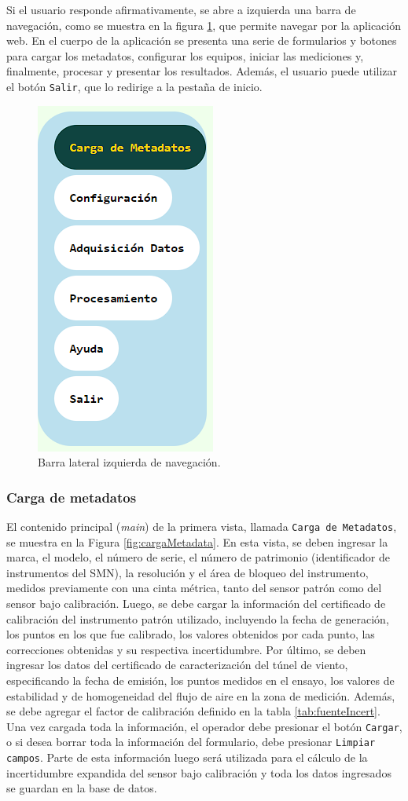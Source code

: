 Si el usuario responde afirmativamente, se abre a izquierda una barra de navegación, como se muestra en la figura \ref{fig:barraNavegIzq}, que permite navegar por la aplicación web. En el cuerpo de la aplicación se presenta una serie de formularios y botones para cargar los metadatos, configurar los equipos, iniciar las mediciones y, finalmente, procesar y presentar los resultados. Además, el usuario puede utilizar el botón \texttt{Salir}, que lo redirige a la pestaña de inicio.

\begin{figure}[H]
    \centering
    \includegraphics[width=0.2\linewidth]{Figuras/AplicacionWeb/frondend/barraNavegIzq.png}
    \caption{Barra lateral izquierda de navegación.}
    \label{fig:barraNavegIzq}
\end{figure}
\subsubsection{Carga de metadatos}\label{sec:cargaMetadatos}

El contenido principal (\textit{main}) de la primera vista, llamada \texttt{Carga de Metadatos}, se muestra en la Figura \ref{fig:cargaMetadata}. En esta vista, se deben ingresar la marca, el modelo, el número de serie, el número de patrimonio (identificador de instrumentos del SMN), la resolución y el área de bloqueo del instrumento, medidos previamente con una cinta métrica, tanto del sensor patrón como del sensor bajo calibración. Luego, se debe cargar la información del certificado de calibración del instrumento patrón utilizado, incluyendo la fecha de generación, los puntos en los que fue calibrado, los valores obtenidos por cada punto, las correcciones obtenidas y su respectiva incertidumbre. Por último, se deben ingresar los datos del certificado de caracterización del túnel de viento, especificando la fecha de emisión, los puntos medidos en el ensayo, los valores de estabilidad y de homogeneidad del flujo de aire en la zona de medición. Además, se debe agregar el factor de calibración definido en la tabla \ref{tab:fuenteIncert}. Una vez cargada toda la información, el operador debe presionar el botón \texttt{Cargar}, o si desea borrar toda la información del formulario, debe presionar \texttt{Limpiar campos}. Parte de esta información luego será utilizada para el cálculo de la incertidumbre expandida del sensor bajo calibración y toda los datos ingresados se guardan en la base de datos.

